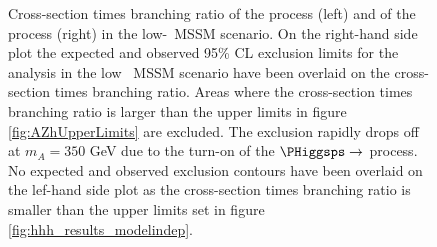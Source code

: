 \begin{figure}[h!]
\begin{center}
\caption{Cross-section times branching ratio of the \Htohhtobbtautau process (left) and of the
\AtoZhtolltautau process (right) in the low-\tanb ~MSSM scenario. On the right-hand side
plot the expected and observed 95\% CL exclusion limits for the \AtoZhtolltautau analysis in the low \tanb ~MSSM scenario
have been overlaid on the cross-section times branching ratio. Areas where the cross-section times branching
ratio is larger than the upper limits in figure \ref{fig:AZhUpperLimits} are excluded. The exclusion rapidly drops
off at $m_A = 350$ GeV due to the turn-on of the $\PHiggsps \rightarrow$ \ttbar process.
No expected and observed exclusion contours
have been overlaid on the lef-hand side plot as the cross-section times branching
ratio is smaller than the upper limits set in figure \ref{fig:hhh_results_modelindep}.}
\label{fig:HhhAndAZhlowtanb}
\end{center}
\end{figure}





